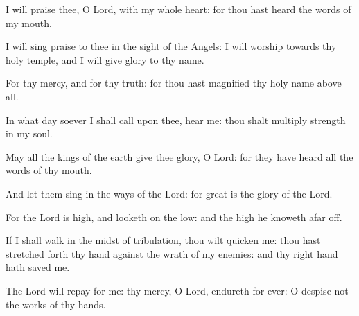 \item I will praise thee, O Lord, with my whole heart: for thou hast heard the words of my mouth.
\item I will sing praise to thee in the sight of the Angels: I will worship towards thy holy temple, and I will give glory to thy name.
\item For thy mercy, and for thy truth: for thou hast magnified thy holy name above all.
\item In what day soever I shall call upon thee, hear me: thou shalt multiply strength in my soul.
\item May all the kings of the earth give thee glory, O Lord: for they have heard all the words of thy mouth.
\item And let them sing in the ways of the Lord: for great is the glory of the Lord.
\item For the Lord is high, and looketh on the low: and the high he knoweth afar off.
\item If I shall walk in the midst of tribulation, thou wilt quicken me: thou hast stretched forth thy hand against the wrath of my enemies: and thy right hand hath saved me.
\item The Lord will repay for me: thy mercy, O Lord, endureth for ever: O despise not the works of thy hands.
